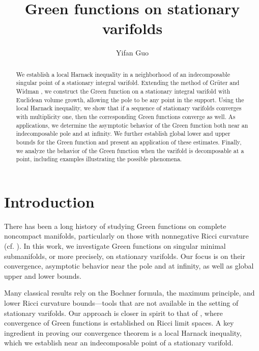 \documentclass[11pt]{amsart}
\theoremstyle{definition}
\begin{document}
\begin{abstract}
    We establish a local Harnack inequality in a neighborhood of an indecomposable singular point of a stationary integral varifold. Extending the method of Gr\"uter and Widman \cite{gruter1982green}, we construct the Green function on a stationary integral varifold with Euclidean volume growth, allowing the pole to be any point in the support. Using the local Harnack inequality, we show that if a sequence of stationary varifolds converges with multiplicity one, then the corresponding Green functions converge as well. As applications, we determine the asymptotic behavior of the Green function both near an indecomposable pole and at infinity. We further establish global lower and upper bounds for the Green function and present an application of these estimates. Finally, we analyze the behavior of the Green function when the varifold is decomposable at a point, including examples illustrating the possible phenomena.
\end{abstract}
\title{Green functions on stationary varifolds}
\author{Yifan Guo}
\address{Courant Institute, New York University, 251 Mercer St, New York, NY, USA, 10012}
\maketitle
\section{Introduction}
There has been a long history of studying Green functions on complete noncompact manifolds, particularly on those with nonnegative Ricci curvature (cf. \cite{CLY,CM1,D,littman1963regular,LT,LY,Var}). In this work, we investigate Green functions on singular minimal submanifolds, or more precisely, on stationary varifolds. Our focus is on their convergence, asymptotic behavior near the pole and at infinity, as well as global upper and lower bounds.

Many classical results rely on the Bochner formula, the maximum principle, and lower Ricci curvature bounds—tools that are not available in the setting of stationary varifolds. Our approach is closer in spirit to that of \cite{D}, where convergence of Green functions is established on Ricci limit spaces. A key ingredient in proving our convergence theorem is a local Harnack inequality, which we establish near an indecomposable point of a stationary varifold.
\end{document}
